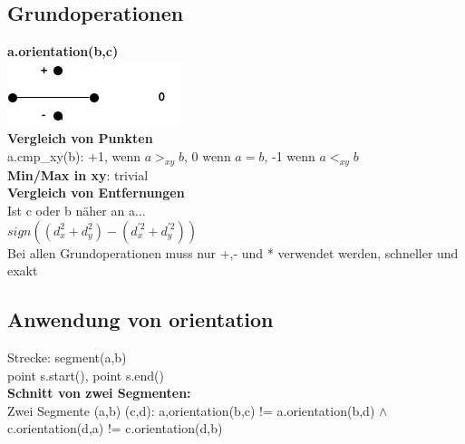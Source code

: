 \documentclass[a4paper]{article}
\begin{document}
\subsection*{Grundoperationen}
\textbf{a.orientation(b,c)}\\
\includegraphics[scale=1]{orientation.png}\\
\textbf{Vergleich von Punkten}\\
a.cmp\_xy(b): +1, wenn $a>_{xy}b$, 0 wenn $a=b$, -1 wenn $a<_{xy}b$\\
\textbf{Min/Max in xy}: trivial\\
\textbf{Vergleich von Entfernungen}\\
Ist c oder b näher an a...\\
$sign((d_x^2+d_y^2) - (d_x^{'2} + d_y^{'2}))$ \\
Bei allen Grundoperationen muss nur +,- und * verwendet werden, schneller und exakt\\
\subsection*{Anwendung von orientation}
Strecke: segment(a,b)\\
point s.start(), point s.end()\\
\textbf{Schnitt von zwei Segmenten:} \\
Zwei Segmente (a,b) (c,d): a,orientation(b,c) != a.orientation(b,d) $\wedge$ c.orientation(d,a) != c.orientation(d,b)\\
\end{document}
